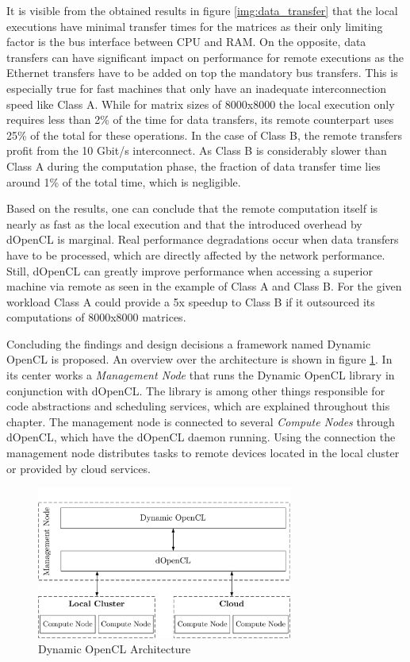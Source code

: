 It is visible from the obtained results in figure \ref{img:data_transfer} that the local executions have minimal transfer times for the matrices as their only limiting factor is the bus interface between CPU and RAM. On the opposite, data transfers can have significant impact on performance for remote executions as the Ethernet transfers have to be added on top the mandatory bus transfers. This is especially true for fast machines that only have an inadequate interconnection speed like Class A. While for matrix sizes of 8000x8000 the local execution only requires less than 2\% of the time for data transfers, its remote counterpart uses 25\% of the total for these operations. In the case of Class B, the remote transfers profit from the 10 Gbit/s interconnect. As Class B is considerably slower than Class A during the computation phase, the fraction of data transfer time lies around 1\% of the total time, which is negligible.

Based on the results, one can conclude that the remote computation itself is nearly as fast as the local execution and that the introduced overhead by dOpenCL is marginal. Real performance degradations occur when data transfers have to be processed, which are directly affected by the network performance. Still, dOpenCL can greatly improve performance when accessing a superior machine via remote as seen in the example of Class A and Class B. For the given workload Class A could provide a 5x speedup to Class B if it outsourced its computations of 8000x8000 matrices.

Concluding the findings and design decisions a framework named Dynamic OpenCL is proposed. An overview over the architecture is shown in figure \ref{img:dynamic_opencl_arch}. In its center works a \textit{Management Node} that runs the Dynamic OpenCL library in conjunction with dOpenCL. The library is among other things responsible for code abstractions and scheduling services, which are explained throughout this chapter. The management node is connected to several \textit{Compute Nodes} through dOpenCL, which have the dOpenCL daemon running. Using the connection the management node distributes tasks to remote devices located in the local cluster or provided by cloud services.

\begin{figure}[H]
	
	\includegraphics[width=0.75\textwidth]{drawings/dynamic_opencl_arch.pdf}
	\centering
	\caption{Dynamic OpenCL Architecture}
	\label{img:dynamic_opencl_arch}
\end{figure}

